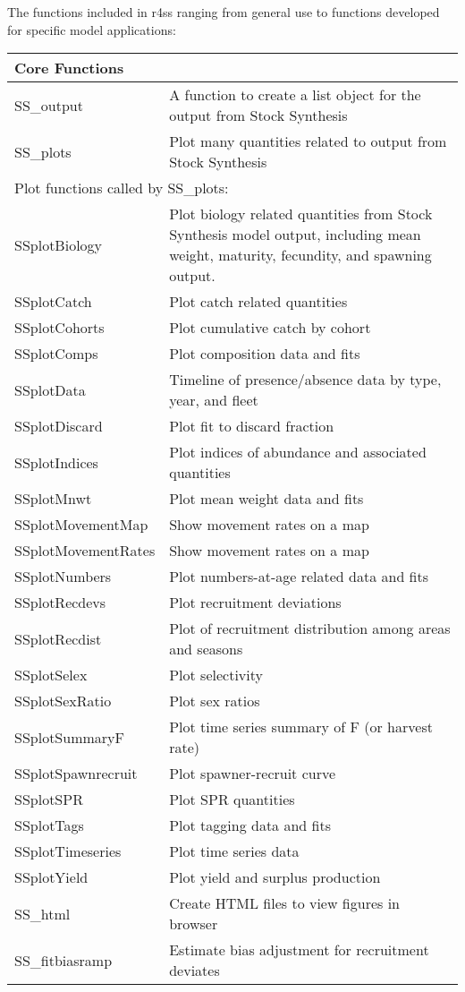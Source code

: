 The functions included in r4ss ranging from general use to functions developed for specific model applications:
\begin{center}
	\begin{longtable}{p{4.5cm} p{10.52cm}}
		\hline
		Core Functions & \Tstrut\Bstrut\\
		\hline
		SS\_output \Tstrut& A function to create a list object for the output from Stock Synthesis\\
		SS\_plots  \Tstrut& Plot many quantities related to output from Stock Synthesis\\
		\hline
		
		\multicolumn{2}{l}{Plot functions called by SS\_plots:} \Tstrut\Bstrut\\
		\hline
		SSplotBiology \Tstrut& Plot biology related quantities from Stock Synthesis model output, including mean weight, maturity, fecundity, and spawning output. \\
		SSplotCatch   \Tstrut & Plot catch related quantities \\
		SSplotCohorts \Tstrut & Plot cumulative catch by cohort \\
		SSplotComps   \Tstrut & Plot composition data and fits \\
		SSplotData    \Tstrut & Timeline of presence/absence data by type, year, and fleet \\
		SSplotDiscard \Tstrut & Plot fit to discard fraction \\
		SSplotIndices \Tstrut & Plot indices of abundance and associated quantities \\
		SSplotMnwt    \Tstrut & Plot mean weight data and fits \\
		SSplotMovementMap \Tstrut & Show movement rates on a map \\
		SSplotMovementRates \Tstrut & Show movement rates on a map \\
		SSplotNumbers \Tstrut& Plot numbers-at-age related data and fits \\
		SSplotRecdevs \Tstrut& Plot recruitment deviations \\
		SSplotRecdist \Tstrut& Plot of recruitment distribution among areas and seasons \\
		SSplotSelex   \Tstrut& Plot selectivity \\
		SSplotSexRatio \Tstrut& Plot sex ratios \\
		SSplotSummaryF \Tstrut& Plot time series summary of F (or harvest rate) \\
		SSplotSpawnrecruit \Tstrut& Plot spawner-recruit curve \\
		SSplotSPR     \Tstrut& Plot SPR quantities \\
		SSplotTags    \Tstrut& Plot tagging data and fits \\
		SSplotTimeseries \Tstrut& Plot time series data \\
		SSplotYield   \Tstrut& Plot yield and surplus production \\
		SS\_html \Tstrut& Create HTML files to view figures in browser \\
		SS\_fitbiasramp \Tstrut& Estimate bias adjustment for recruitment deviates \Bstrut\\
		\hline
	

\end{longtable}
\end{center}
